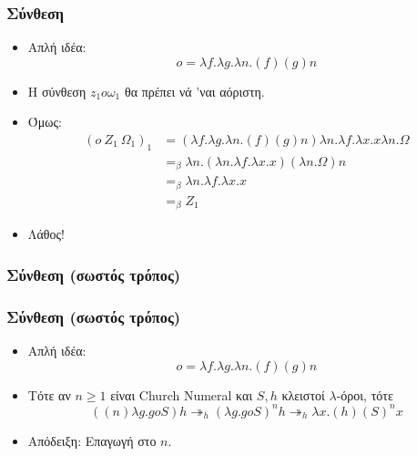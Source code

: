 \documentclass{beamer}
\begin{document}
\begin{frame}
  \frametitle{Σύνθεση}
  \begin{itemize}
  \item Απλή ιδέα: $$o = \lambda f. \lambda g. \lambda n . (f) (g) n$$
  \item Η σύνθεση $z_1 o \omega_1$ θα πρέπει νά 'ναι αόριστη.  \pause
  \item Όμως:
    $$
    \begin{array}{ll}
      (o\:Z_1\:\Omega_1)_1 &= (\lambda f. \lambda g. \lambda n . (f)
      (g) n) \lambda n. \lambda f. \lambda x . x \lambda n. \Omega \\
      &=_\beta \lambda n . (\lambda n. \lambda f. \lambda x . x)
      (\lambda n. \Omega) n \\
      &=_\beta \lambda n . \lambda f. \lambda x . x \\
      &=_\beta Z_1
    \end{array}
    $$
    \pause
  \item Λάθος!
  \end{itemize}
\end{frame}

\subsubsection{Σύνθεση (σωστός τρόπος)}

\begin{frame}
  \frametitle{Σύνθεση (σωστός τρόπος)}
  \begin{itemize}
  \item Απλή ιδέα: $$o = \lambda f. \lambda g. \lambda n . (f) (g) n$$
    \pause
  \item Τότε αν $n \geqslant 1$ είναι Church Numeral και $S, h$
    κλειστοί $\lambda$-όροι, τότε
    $$ ((n) \lambda g . g o S) h \twoheadrightarrow _h (\lambda g . g
    o S)^n h \twoheadrightarrow _h \lambda x . (h) (S)^n x $$ \pause
  \item Απόδειξη: Επαγωγή στο $n$.
  \end{itemize}
\end{frame}
\end{document}
